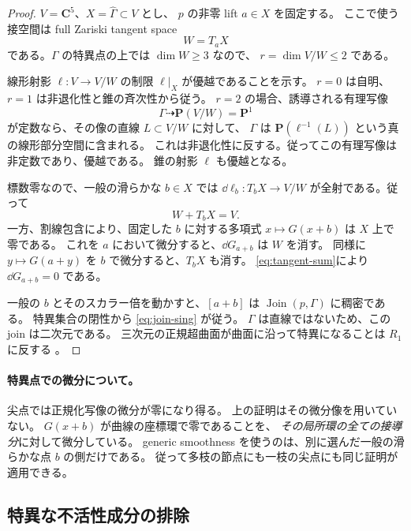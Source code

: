 \documentclass[11pt,a4paper]{ltjsarticle}
\newcommand{\CC}{\mathbf C}\newcommand{\QQ}{\mathbf Q}
\newcommand{\PP}{\mathbf P}\renewcommand{\AA}{\mathbf A}
\theoremstyle{remark}\newtheorem{remark}[theorem]{注意}
\begin{document}
\begin{proof}
$V=\CC^5$、$X=\widehat\Gamma\subset V$ とし、
$p$ の非零 lift $a\in X$ を固定する。
ここで使う接空間は full Zariski tangent space
\[
W=T_aX
\]
である。$\Gamma$ の特異点の上では $\dim W\ge3$ なので、
$r=\dim V/W\le2$ である。

線形射影 $\ell:V\to V/W$ の制限 $\ell|_X$ が優越であることを示す。
$r=0$ は自明、$r=1$ は非退化性と錐の斉次性から従う。
$r=2$ の場合、誘導される有理写像
\[
\Gamma\dashrightarrow\PP(V/W)=\PP^1
\]
が定数なら、その像の直線 $L\subset V/W$ に対して、
$\Gamma$ は $\PP(\ell^{-1}(L))$ という真の線形部分空間に含まれる。
これは非退化性に反する。従ってこの有理写像は非定数であり、優越である。
錐の射影 $\ell$ も優越となる。

標数零なので、一般の滑らかな $b\in X$ では
$\dd\ell_b:T_bX\to V/W$ が全射である。従って
\begin{equation}\label{eq:tangent-sum}
W+T_bX=V.
\end{equation}
一方、割線包含により、固定した $b$ に対する多項式 $x\mapsto G(x+b)$ は $X$ 上で零である。
これを $a$ において微分すると、$\dd G_{a+b}$ は $W$ を消す。
同様に $y\mapsto G(a+y)$ を $b$ で微分すると、$T_bX$ も消す。
\eqref{eq:tangent-sum}により $\dd G_{a+b}=0$ である。

一般の $b$ とそのスカラー倍を動かすと、$[a+b]$ は
$\operatorname{Join}(p,\Gamma)$ に稠密である。
特異集合の閉性から \eqref{eq:join-sing} が従う。
$\Gamma$ は直線ではないため、この join は二次元である。
三次元の正規超曲面が曲面に沿って特異になることは $R_1$ に反する
\cite{StacksNormal}。
\end{proof}

\paragraph{特異点での微分について。}
尖点では正規化写像の微分が零になり得る。
上の証明はその微分像を用いていない。
$G(x+b)$ が曲線の座標環で零であることを、
\emph{その局所環の全ての接導分}に対して微分している。
generic smoothness を使うのは、別に選んだ一般の滑らかな点 $b$ の側だけである。
従って多枝の節点にも一枝の尖点にも同じ証明が適用できる。



\subsection{特異な不活性成分の排除}
\end{document}
